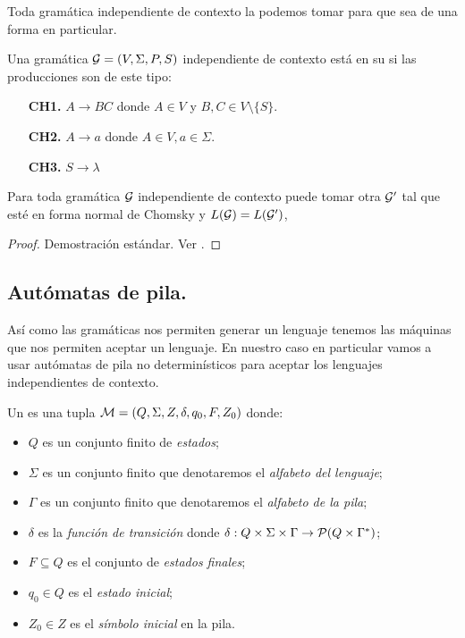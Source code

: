\documentclass[tesis.tex]{subfiles}
\newcommand{\gramatica}{{\cal G} = (V, \Sigma, P, S)}
\newcommand{\lengderivado}{L({\cal G})}
\begin{document}
Toda gramática independiente de contexto la podemos tomar para que sea de una forma en particular.

\begin{deff}
	Una gramática $\gramatica$ independiente de contexto está en su  si las producciones son de este tipo:
	\begin{enumerate}
		\item[\textbf{CH1.}] $A \to BC$ donde $A\in V$ y $B,C \in V \setminus \{ S \}$.
		\item[\textbf{CH2.}] $A \to a$ donde $A \in V, a \in \Sigma$.
		\item[\textbf{CH3.}] $S \to \lambda$ 
	\end{enumerate}
\end{deff}

\begin{ej}
\end{ej}

\begin{prop}
	Para toda gramática $\cal G$ independiente de contexto puede tomar otra $\cal G'$ tal que esté en forma normal de Chomsky y $\lengderivado = L(\cal G')$,
\end{prop}

\begin{proof}
	Demostración estándar. Ver \cite{hopcraft-ullman}.
\end{proof}

\subsection{Autómatas de pila.}
Así como las gramáticas nos permiten generar un lenguaje tenemos las máquinas que nos permiten aceptar un lenguaje. En nuestro caso en particular vamos a usar autómatas de pila no determinísticos para aceptar los lenguajes independientes de contexto.

\begin{deff}
	Un  es una tupla ${\cal M } = (Q, \Sigma, Z, \delta, q_0, F, Z_0)$ donde:
	\begin{itemize}
		\item $Q$ es un conjunto finito de \emph{estados};
		\item $\Sigma$ es un conjunto finito que denotaremos el \emph{alfabeto del lenguaje};
		\item $\Gamma$ es un conjunto finito que denotaremos el \emph{alfabeto de la pila};
		\item $\delta$ es la \emph{función de transición} donde $\delta: Q  \times \Sigma \times \Gamma \to {\cal P}( Q  \times \Gamma^*)$;
		\item $F \subseteq Q$ es el conjunto de \emph{estados finales};
		\item $q_0 \in Q$ es el \emph{estado inicial};
		\item $Z_0 \in Z$ es el \emph{símbolo inicial} en la pila.
	\end{itemize}
\end{deff}
\end{document}
